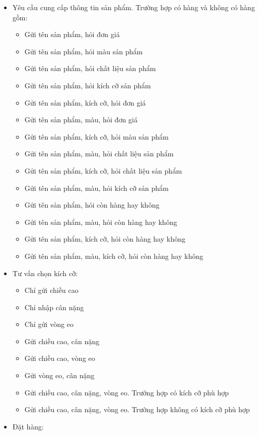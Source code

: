 \begin{itemize}
    \item Yêu cầu cung cấp thông tin sản phẩm. Trường hợp có hàng và
    không có hàng gồm:
    \begin{itemize}
        \item Gửi tên sản phẩm, hỏi đơn giá
        \item Gửi tên sản phẩm, hỏi màu sản phẩm
        \item Gửi tên sản phẩm, hỏi chất liệu sản phẩm
        \item Gửi tên sản phẩm, hỏi kích cỡ sản phẩm
        \item Gửi tên sản phẩm, kích cỡ, hỏi đơn giá
        \item Gửi tên sản phẩm, màu, hỏi đơn giá
        \item Gửi tên sản phẩm, kích cỡ, hỏi màu sản phẩm
        \item Gửi tên sản phẩm, màu, hỏi chất liệu sản phẩm
        \item Gửi tên sản phẩm, kích cỡ, hỏi chất liệu sản phẩm
        \item Gửi tên sản phẩm, màu, hỏi kích cỡ sản phẩm
        \item Gửi tên sản phẩm, hỏi còn hàng hay không
        \item Gửi tên sản phẩm, màu, hỏi còn hàng hay không
        \item Gửi tên sản phẩm, kích cỡ, hỏi còn hàng hay không
        \item Gửi tên sản phẩm, màu, kích cỡ, hỏi còn hàng hay không
    \end{itemize}
    \item Tư vấn chọn kích cỡ:
    \begin{itemize}
        \item Chỉ gửi chiều cao
        \item Chỉ nhập cân nặng
        \item Chỉ gửi vòng eo
        \item Gửi chiều cao, cân nặng
        \item Gửi chiều cao, vòng eo
        \item Gửi vòng eo, cân nặng
        \item Gửi chiều cao, cân nặng, vòng eo. Trường hợp có
        kích cỡ phù hợp
        \item Gửi chiều cao, cân nặng, vòng eo. Trường hợp không có
        kích cỡ phù hợp
    \end{itemize}
    \item Đặt hàng:

\end{itemize}
